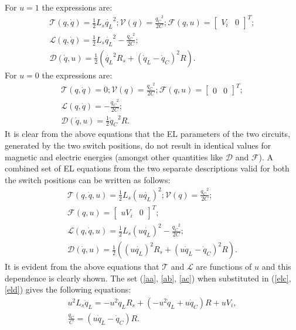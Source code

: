 \documentclass[preprint,12pt]{elsarticle}
\begin{document}
For $u=1$ the expressions are: 
\begin{eqnarray}
\mathcal{T}(q,\dot{q}) = \frac{1}{2}L_s\dot{q_L}^2 ; \mathcal{V}(q) = \frac{{q_C}^2}{2C} ; \mathcal{F}(q,u) = \left[\begin{array}{cc}
V_i & 0 
\end{array}\right]^T;\\
\mathcal{L}(q,\dot{q})=\frac{1}{2}L_s\dot{q_L}^2-\frac{{{q}_C}^2}{2C};\\ 
\mathcal{D}(\dot{q},u)=\frac{1}{2}(\dot{q_L}^2R_s+(\dot{q}_L-\dot{q}_C)^2R).
\end{eqnarray}
For $u=0$ the expressions are: 
\begin{eqnarray}\label{a1}
\mathcal{T}(q,\dot{q}) = 0 ; \mathcal{V}(q) = \frac{{q_C}^2}{2C} ; \mathcal{F}(q,u) = \left[\begin{array}{cc}
0 & 0 
\end{array}\right]^T;\\\label{a2}
\mathcal{L}(q,\dot{q})=-\frac{{{q}_C}^2}{2C};\\ 
\mathcal{D}(\dot{q},u)=\frac{1}{2}{\dot{q}_C}^2R.\label{a3}
\end{eqnarray}
It is clear from the above equations that the EL parameters of the two circuits, generated by the two switch positions, do not result in identical values for magnetic and electric energies (amongst other quantities like $\mathcal{D}$ and $\mathcal{F}$). A combined set of EL equations from the two separate descriptions valid for both the switch positions can be written as follows: 
\begin{eqnarray} 
\mathcal{T}(q,\dot{q},u) = \frac{1}{2}L_s{(u\dot{q_L})}^2 ; \mathcal{V}(q) = \frac{{q_C}^2}{2C};\\ \label{aa}
\mathcal{F}(q,u) = \left[\begin{array}{cc}
uV_i & 0 
\end{array}\right]^T;\\ \label{ab}
\mathcal{L}(q,\dot{q},u)=\frac{1}{2}L_s{(u\dot{q_L})}^2-\frac{{{q}_C}^2}{2C};\\ \label{ac}
\mathcal{D}(\dot{q},u)=\frac{1}{2}({(u\dot{q_L})}^2R_s+(u\dot{q}_L-\dot{q}_C)^2R). 
\end{eqnarray}
It is evident from the above equations that $\mathcal{T}$ and $\mathcal{L}$ are functions of $u$ and this dependence is clearly shown. The set (\ref{aa}, \ref{ab}, \ref{ac}) when substituted in (\ref{elc},\ref{eld}) gives the following equations:
\begin{eqnarray}\label{x2}
u^2L_s\ddot{q}_L=-u^2\dot{q}_LR_s+(-u^2\dot{q}_L+u\dot{q}_C)R+uV_i,\\
\frac{q_C}{C}=(u\dot{q}_L-\dot{q}_C)R.\label{x3}
\end{eqnarray}
\end{document}
